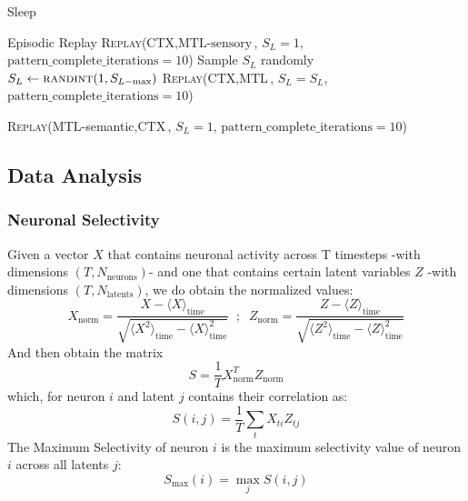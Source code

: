 \documentclass{article}
\begin{document}
\begin{algorithm}[h!]
\caption{Sleep}\label{alg:sleep}
\begin{algorithmic}[1]
\State Episodic Replay
            \State \textsc{Replay}(\textrm{CTX}$, \textrm{MTL-sensory}$, $S_L= 1$, $\textrm{pattern\_complete\_iterations}=10$)
        \Else
        \State Sample $S_L$ randomly
        \State $S_L \gets \textsc{randint}(1, S_{L-\textrm{max}})$
            \State \textsc{Replay}(\textrm{CTX}$, \textrm{MTL}$, $S_L= S_L$, $\textrm{pattern\_complete\_iterations}=10$)
        \EndIf
    \EndFor

            \State \textsc{Replay}(\textrm{MTL-semantic}$, \textrm{CTX}$, $S_L= 1$, $\textrm{pattern\_complete\_iterations}=10$)
        \EndFor
    \EndIf
\EndFunction
\end{algorithmic}
\end{algorithm}
\clearpage
\subsection*{Data Analysis}
\subsubsection*{Neuronal Selectivity}
Given a vector $X$ that contains neuronal activity across T timesteps -with dimensions $(T, N_\textrm{neurons})$- and one that contains certain latent variables $Z$ -with dimensions  $(T, N_\textrm{latents})$, we do obtain the normalized values:
\begin{equation}
    X_\textrm{norm} = \frac{X - \langle X \rangle_{\textrm{time}}}{\sqrt{\langle X^2 \rangle_\textrm{time} - \langle X \rangle_\textrm{time}^2}} \;\; ; \;\; Z_\textrm{norm} = \frac{Z - \langle Z \rangle_{\textrm{time}}}{\sqrt{\langle Z^2 \rangle_\textrm{time} - \langle Z \rangle_\textrm{time}^2}}
\end{equation} 
And then obtain the matrix 
\begin{equation}
    S = \frac{1}{T}X_\textrm{norm}^TZ_\textrm{norm}
\end{equation}
which, for neuron $i$ and latent $j$ contains their correlation as:
\begin{equation}
    S(i, j) = \frac{1}{T}\sum_t X_{ti}Z_{tj}
\end{equation}
The Maximum Selectivity of neuron $i$ is the maximum selectivity value of neuron $i$ across all latents $j$:
\begin{equation}
    S_\textrm{max}(i) = \max_{j}{S(i, j)}
\end{equation}
\end{document}

